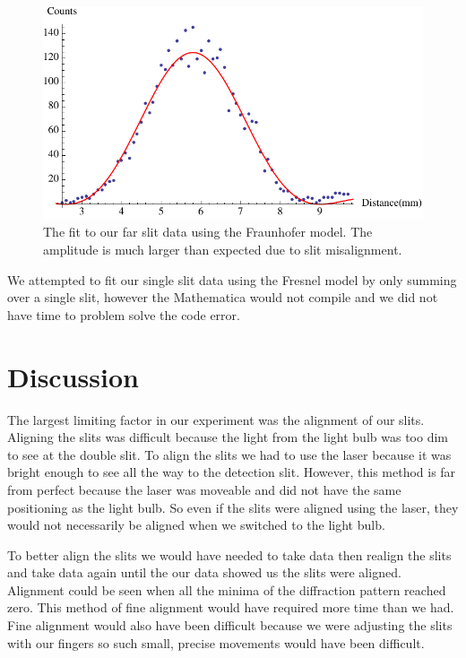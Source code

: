 \documentclass[prb,preprint]{revtex4-1}
\begin{document}
\begin{figure}[h!]
\centering
\includegraphics[width=6in]{farfraun.pdf}
\caption{The fit to our far slit data using the Fraunhofer model. The amplitude is much larger than expected due to slit misalignment.}
\label{farfraun}
\end{figure}

We attempted to fit our single slit data using the Fresnel model by only summing over a single slit, however the Mathematica would not compile and we did not have time to problem solve the code error.


\section{Discussion}

The largest limiting factor in our experiment was the alignment of our slits. Aligning the slits was difficult because the light from the light bulb was too dim to see at the double slit. To align the slits we had to use the laser because it was bright enough to see all the way to the detection slit. However, this method is far from perfect because the laser was moveable and did not have the same positioning as the light bulb. So even if the slits were aligned using the laser, they would not necessarily be aligned when we switched to the light bulb.

To better align the slits we would have needed to take data then realign the slits and take data again until the our data showed us the slits were aligned. Alignment could be seen when all the minima of the diffraction pattern reached zero. This method of fine alignment would have required more time than we had. Fine alignment would also have been difficult because we were adjusting the slits with our fingers so such small, precise movements would have been difficult.
\end{document}
